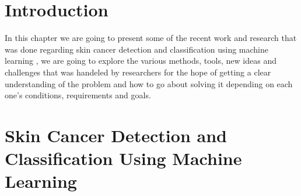 \section{Introduction}
In this chapter we are going to present some of the recent work and research that was done regarding skin cancer detection and classification using machine learning , we are going to explore the various methods, tools, new ideas and challenges that was handeled by researchers for the hope of getting a clear understanding of the problem and how to go about solving it depending on each one's conditions, requirements and goals.



\section{Skin Cancer Detection and Classification Using Machine Learning}
